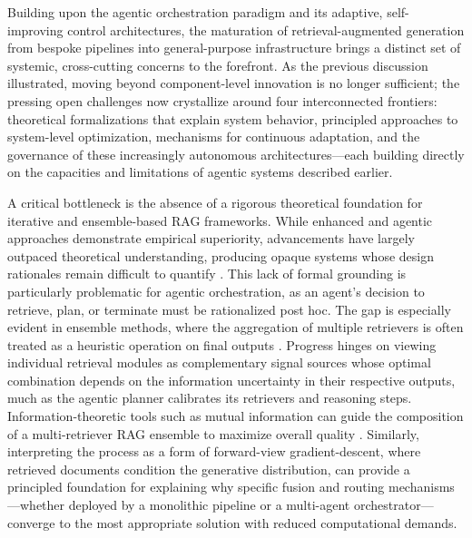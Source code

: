 \documentclass[11pt,a4paper]{article}
\begin{document}
Building upon the agentic orchestration paradigm and its adaptive, self-improving control architectures, the maturation of retrieval-augmented generation from bespoke pipelines into general-purpose infrastructure brings a distinct set of systemic, cross-cutting concerns to the forefront. As the previous discussion illustrated, moving beyond component-level innovation is no longer sufficient; the pressing open challenges now crystallize around four interconnected frontiers: theoretical formalizations that explain system behavior, principled approaches to system-level optimization, mechanisms for continuous adaptation, and the governance of these increasingly autonomous architectures---each building directly on the capacities and limitations of agentic systems described earlier.

A critical bottleneck is the absence of a rigorous theoretical foundation for iterative and ensemble-based RAG frameworks. While enhanced and agentic approaches demonstrate empirical superiority, advancements have largely outpaced theoretical understanding, producing opaque systems whose design rationales remain difficult to quantify \cite{arxiv:2506.00054v1}. This lack of formal grounding is particularly problematic for agentic orchestration, as an agent's decision to retrieve, plan, or terminate must be rationalized post hoc. The gap is especially evident in ensemble methods, where the aggregation of multiple retrievers is often treated as a heuristic operation on final outputs \cite{arxiv:2508.13828v1}. Progress hinges on viewing individual retrieval modules as complementary signal sources whose optimal combination depends on the information uncertainty in their respective outputs, much as the agentic planner calibrates its retrievers and reasoning steps. Information-theoretic tools such as mutual information can guide the composition of a multi-retriever RAG ensemble to maximize overall quality \cite{arxiv:2508.13828v1}. Similarly, interpreting the process as a form of forward-view gradient-descent, where retrieved documents condition the generative distribution, can provide a principled foundation for explaining why specific fusion and routing mechanisms---whether deployed by a monolithic pipeline or a multi-agent orchestrator---converge to the most appropriate solution with reduced computational demands.
\end{document}
